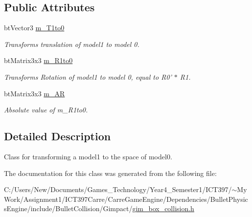\subsection*{Public Attributes}
\begin{CompactItemize}
\item 
\hypertarget{class_g_i_m___b_o_x___b_o_x___t_r_a_n_s_f_o_r_m___c_a_c_h_e_f6aacf8817de360554f57799db41c8b4}{
btVector3 \hyperlink{class_g_i_m___b_o_x___b_o_x___t_r_a_n_s_f_o_r_m___c_a_c_h_e_f6aacf8817de360554f57799db41c8b4}{m\_\-T1to0}}
\label{class_g_i_m___b_o_x___b_o_x___t_r_a_n_s_f_o_r_m___c_a_c_h_e_f6aacf8817de360554f57799db41c8b4}

\begin{CompactList}\small\item\em Transforms translation of model1 to model 0. \item\end{CompactList}\item 
\hypertarget{class_g_i_m___b_o_x___b_o_x___t_r_a_n_s_f_o_r_m___c_a_c_h_e_97597f0d242e71eb8ad458838428aa09}{
btMatrix3x3 \hyperlink{class_g_i_m___b_o_x___b_o_x___t_r_a_n_s_f_o_r_m___c_a_c_h_e_97597f0d242e71eb8ad458838428aa09}{m\_\-R1to0}}
\label{class_g_i_m___b_o_x___b_o_x___t_r_a_n_s_f_o_r_m___c_a_c_h_e_97597f0d242e71eb8ad458838428aa09}

\begin{CompactList}\small\item\em Transforms Rotation of model1 to model 0, equal to R0' $\ast$ R1. \item\end{CompactList}\item 
\hypertarget{class_g_i_m___b_o_x___b_o_x___t_r_a_n_s_f_o_r_m___c_a_c_h_e_c6241a28e1c1c1e4a581ba547e30409e}{
btMatrix3x3 \hyperlink{class_g_i_m___b_o_x___b_o_x___t_r_a_n_s_f_o_r_m___c_a_c_h_e_c6241a28e1c1c1e4a581ba547e30409e}{m\_\-AR}}
\label{class_g_i_m___b_o_x___b_o_x___t_r_a_n_s_f_o_r_m___c_a_c_h_e_c6241a28e1c1c1e4a581ba547e30409e}

\begin{CompactList}\small\item\em Absolute value of m\_\-R1to0. \item\end{CompactList}\end{CompactItemize}


\subsection{Detailed Description}
Class for transforming a model1 to the space of model0. 

The documentation for this class was generated from the following file:\begin{CompactItemize}
\item 
C:/Users/New/Documents/Games\_\-Technology/Year4\_\-Semester1/ICT397/$\sim$My Work/Assignment1/ICT397Carre/CarreGameEngine/Dependencies/BulletPhysicsEngine/include/BulletCollision/Gimpact/\hyperlink{gim__box__collision_8h}{gim\_\-box\_\-collision.h}\end{CompactItemize}
